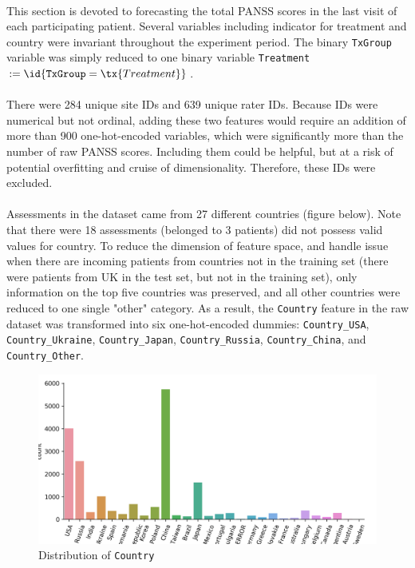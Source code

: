 \documentclass[11pt]{article}
\begin{document}
	\paragraph{} This section is devoted to forecasting the total PANSS scores in the last visit of each participating patient. Several variables including indicator for treatment and country were invariant throughout the experiment period. The binary \texttt{TxGroup} variable was simply reduced to one binary variable \texttt{Treatment} $:= \id{\texttt{TxGroup} = \tx{Treatment}}$.
	
	\paragraph{} There were 284 unique site IDs and 639 unique rater IDs. Because IDs were numerical but not ordinal, adding these two features would require an addition of more than 900 one-hot-encoded variables, which were significantly more than the number of raw PANSS scores. Including them could be helpful, but at a risk of potential overfitting and cruise of dimensionality. Therefore, these IDs were excluded.
	\paragraph{} Assessments in the dataset came from 27 different countries (figure below). Note that there were 18 assessments (belonged to 3 patients) did not possess valid values for country. To reduce the dimension of feature space, and handle issue when there are incoming patients from countries not in the training set (there were patients from UK in the test set, but not in the training set), only information on the top five countries was preserved, and all other countries were reduced to one single "other" category. As a result, the \texttt{Country} feature in the raw dataset was transformed into six one-hot-encoded dummies: \texttt{Country\_USA}, \texttt{Country\_Ukraine}, \texttt{Country\_Japan}, \texttt{Country\_Russia}, \texttt{Country\_China}, and \texttt{Country\_Other}.
	\begin{figure}[H]
		\centering
		\includegraphics[width=0.7\linewidth]{figures/dist_country.png}
		\caption{Distribution of \texttt{Country}}
	\end{figure}
	
\end{document}
